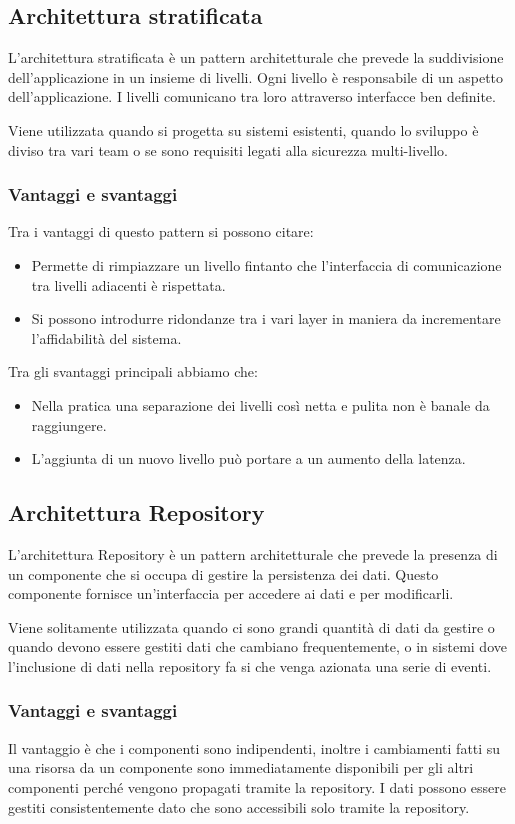 \subsection{Architettura stratificata}
L'architettura stratificata è un pattern architetturale che prevede la suddivisione
dell'applicazione in un insieme di livelli. Ogni livello è responsabile di un aspetto
dell'applicazione. I livelli comunicano tra loro attraverso interfacce ben definite.

Viene utilizzata quando si progetta su sistemi esistenti, quando lo sviluppo è 
diviso tra vari team o se sono requisiti legati alla sicurezza multi-livello.

\subsubsection{Vantaggi e svantaggi}
Tra i vantaggi di questo pattern si possono citare:
\begin{itemize}
    \item Permette di rimpiazzare un livello fintanto che l'interfaccia di comunicazione 
    tra livelli adiacenti è rispettata.
    \item Si possono introdurre ridondanze tra i vari layer in maniera da incrementare 
    l'affidabilità del sistema.
\end{itemize}
Tra gli svantaggi principali abbiamo che:
\begin{itemize}
    \item Nella pratica una separazione dei livelli così netta e pulita non 
    è banale da raggiungere.
    \item L'aggiunta di un nuovo livello può portare a un aumento della latenza.
\end{itemize}
\subsection{Architettura Repository}
L'architettura Repository è un pattern architetturale che prevede la presenza di un
componente che si occupa di gestire la persistenza dei dati. Questo componente
fornisce un'interfaccia per accedere ai dati e per modificarli.

Viene solitamente utilizzata quando ci sono grandi quantità di dati da gestire o
quando devono essere gestiti dati che cambiano frequentemente, o in sistemi dove 
l'inclusione di dati nella repository fa si che venga azionata una serie di
eventi.

\subsubsection{Vantaggi e svantaggi}
Il vantaggio è che i componenti sono indipendenti, inoltre i cambiamenti fatti su una 
risorsa da un componente sono immediatamente disponibili per gli altri componenti perché 
vengono propagati tramite la repository. I dati possono essere gestiti consistentemente 
dato che sono accessibili solo tramite la repository.

